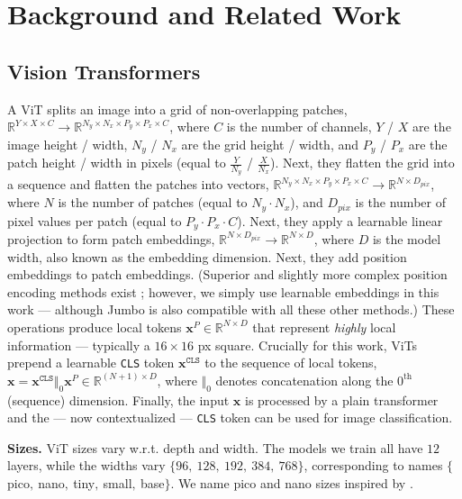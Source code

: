 \section{Background and Related Work}
\subsection{Vision Transformers}

A ViT splits an image into a grid of non-overlapping patches, $\mathbb{R}^{Y \times X \times C}\to \mathbb{R}^{N_y \times N_x \times P_y \times P_x \times C}$, where $C$ is the number of channels, $Y$ / $X$ are the image height / width, $N_y$ / $N_x$ are the grid height / width, and $P_y$ / $P_x$ are the patch height / width in pixels (equal to $\frac{Y}{N_y}$ / $\frac{X}{N_x}$). Next, they flatten the grid into a sequence and flatten the patches into vectors, $\mathbb{R}^{N_y \times N_x \times P_y \times P_x \times C}\to \mathbb{R}^{N \times D_{pix}}$, where $N$ is the number of patches (equal to $N_y \cdot N_x$), and $D_{pix}$ is the number of pixel values per patch (equal to $P_y \cdot P_x \cdot C$). Next, they apply a learnable linear projection to form patch embeddings, $\mathbb{R}^{N \times D_{pix}}\to \mathbb{R}^{N \times D}$, where $D$ is the model width, also known as the embedding dimension. Next, they add position embeddings to patch embeddings. (Superior and slightly more complex position encoding methods exist \cite{weinzaepfel2023croco, heo2025rotary, fuller2024lookhere}; however, we simply use learnable embeddings in this work --- although Jumbo is also compatible with all these other methods.) These operations produce local tokens $\mathbf{x}^{P}\in \mathbb{R}^{N \times D}$ that represent \emph{highly} local information --- typically a $16\times16$ px square. Crucially for this work, ViTs prepend a learnable \texttt{CLS} token $\mathbf{x}^{\texttt{CLS}}$ to the sequence of local tokens, $\mathbf{x} = \mathbf{x}^{\texttt{CLS}} \Vert_{0} \mathbf{x}^{P} \in \mathbb{R}^{(N+1) \times D}$, where $\Vert_{0}$ denotes concatenation along the $0^{\text{th}}$ (sequence) dimension. Finally, the input $\mathbf{x}$ is processed by a plain transformer and the --- now contextualized --- \texttt{CLS} token can be used for image classification.

\textbf{Sizes.} ViT sizes vary w.r.t. depth and width. The models we train all have $12$ layers, while the widths vary $\{96, ~128, ~192, ~384, ~768\}$, corresponding to names $\{$pico$, ~$nano$, ~$tiny$, ~$small$, ~$base$\}$. We name pico and nano sizes inspired by \citet{woo2023convnext}.


